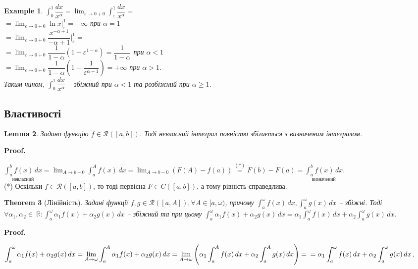 \documentclass[a4paper, 10pt]{article}
\makeatletter
\def\huge{\displaystyle}
\def\qed{$\blacksquare$}
\theoremstyle{theoremdd}
\newtheorem{theorem}{Theorem}[subsection]
\theoremstyle{theoremdd}
\theoremstyle{theoremdd}
\theoremstyle{theoremdd}
\theoremstyle{theoremdd}
\newtheorem{example}[theorem]{Example}
\theoremstyle{theoremdd}
\theoremstyle{theoremdd}
\theoremstyle{theoremdd}
\newtheorem{lemma}[theorem]{Lemma}
\theoremstyle{theoremdd}
\renewenvironment{proof}[1][Proof.\\]{\par
\pushQED{\hfill \qed}%
\normalfont \topsep6\p@\@plus6\p@\relax
\trivlist
\item\relax
{\bfseries
#1\@addpunct{.}}\hspace\labelsep\ignorespaces
}{%
\popQED\endtrivlist\@endpefalse
}
\makeatother
\begin{document}
\begin{example}
$\huge\int_0^1 \dfrac{dx}{x^{\alpha}} = \lim_{\varepsilon \to 0+0} \int_\varepsilon^1 \dfrac{dx}{x^{\alpha}} \boxed{=}$\\
$= \huge\lim_{\varepsilon \to 0+0} \ln x \Big|_\varepsilon^1 = -\infty$ при $\alpha = 1$\\
$= \huge\lim_{\varepsilon \to 0+0} \dfrac{x^{-\alpha+1}}{-\alpha+1} \Big|_\varepsilon^1 =$\\
$=\huge\lim_{\varepsilon \to 0+0} \dfrac{1}{1-\alpha} \left( 1 - \varepsilon^{1-\alpha} \right) = \dfrac{1}{1-\alpha}$ при $\alpha < 1$\\
$=\huge\lim_{\varepsilon \to 0+0} \dfrac{1}{1-\alpha} \left( 1 - \dfrac{1}{\varepsilon^{\alpha-1}} \right) = +\infty$ при $\alpha > 1$.\\
Таким чином, $\huge\int_0^1 \dfrac{dx}{x^\alpha}$ -- збіжний при $\alpha < 1$ та розбіжний при $\alpha \geq 1$.
\end{example}

\subsection{Властивості}
\begin{lemma}
Задано функцію $f \in \mathcal{R}([a,b])$. Тоді невласний інтеграл повністю збігається з визначеним інтегралом.
\end{lemma}

\begin{proof}
$\underset{\text{невласний}}{\huge\int_a^b f(x)\,dx} = \huge \lim_{A \to b-0} \int_a^A f(x)\,dx = \huge \lim_{A \to b-0} (F(A)-f(a)) \overset{(*)}{=} F(b) - F(a) = \underset{\text{визначений}}{\huge\int_a^b f(x)\,dx}$.\\
(*) Оскільки $f \in \mathcal{R}([a,b])$, то тоді первісна $F \in C([a,b])$, а тому рівність справедлива.
\end{proof}

\begin{theorem}[Лінійність]
Задані функції $f,g \in \mathcal{R}([a,A]), \forall A \in [a,\omega)$, причому $\huge\int_a^\omega f(x)\,dx, \huge\int_a^\omega g(x)\,dx$ -- збіжні. Тоді $\forall \alpha_1,\alpha_2 \in ~{\mathbb{R}}: \huge\int_a^\omega \alpha_1 f(x) + \alpha_2 g(x)\,dx$ -- збіжний та при цьому $\huge\int_a^\omega \alpha_1 f(x) + \alpha_2 g(x)\,dx = \alpha_1 \int_a^\omega f(x)\,dx + \alpha_2 \int_a^\omega g(x)\,dx$.
\end{theorem}

\begin{proof}
$\huge\int_a^\omega \alpha_1 f(x) + \alpha_2 g(x)\,dx = \lim_{A \to \omega} \int_a^A \alpha_1 f(x) + \alpha_2 g(x)\,dx = \lim_{A \to \omega} \left( \alpha_1 \int_a^A f(x)\,dx + \alpha_2 \int_a^A g(x)\,dx \right) = \\ = \alpha_1 \int_a^\omega f(x)\,dx + \alpha_2 \int_a^\omega g(x)\,dx$.
\end{proof}
\end{document}
